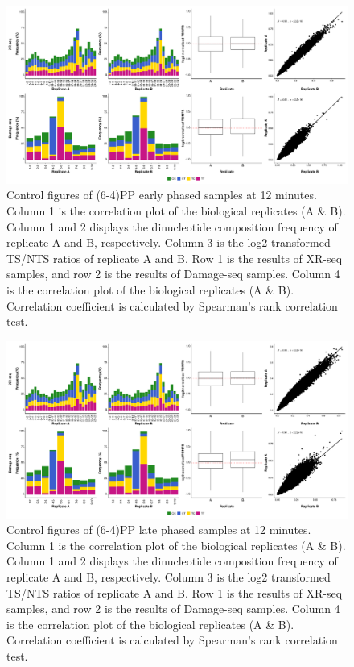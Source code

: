 \begin{figure}[H]
\begin{center}
\includegraphics[width=\textwidth]{Chapters/7_appendix/figures/supfig3}
\caption[Control figures of (6-4)PP early phased samples at 12 minutes.]{Control figures of (6-4)PP early phased samples at 12 minutes. Column 1 is the correlation plot of the biological replicates (A \& B). Column 1 and 2 displays the dinucleotide composition frequency of replicate A and B, respectively. Column 3 is the log2 transformed TS/NTS ratios of replicate A and B. Row 1 is the results of XR-seq samples, and row 2 is the results of Damage-seq samples. Column 4 is the correlation plot of the biological replicates (A \& B). Correlation coefficient is calculated by Spearman’s rank correlation test.}
\label{supfig:control2}
\end{center}
\end{figure}


\begin{figure}[H]
\begin{center}
\includegraphics[width=\textwidth]{Chapters/7_appendix/figures/supfig4}
\caption[Control figures of (6-4)PP late phased samples at 12 minutes.]{Control figures of (6-4)PP late phased samples at 12 minutes. Column 1 is the correlation plot of the biological replicates (A \& B). Column 1 and 2 displays the dinucleotide composition frequency of replicate A and B, respectively. Column 3 is the log2 transformed TS/NTS ratios of replicate A and B. Row 1 is the results of XR-seq samples, and row 2 is the results of Damage-seq samples. Column 4 is the correlation plot of the biological replicates (A \& B). Correlation coefficient is calculated by Spearman’s rank correlation test.}
\label{supfig:control3}
\end{center}
\end{figure}


